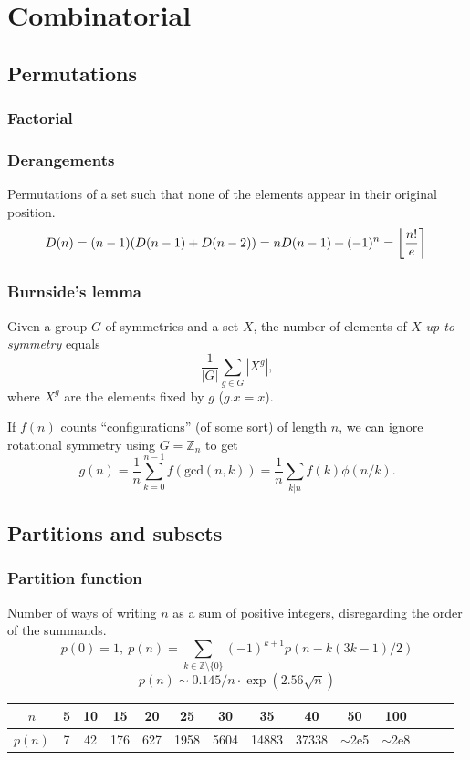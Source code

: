 \chapter{Combinatorial}

\section{Permutations}
	\subsection{Factorial}

	\subsection{Derangements}
		Permutations of a set such that none of the elements appear in their original position.
		\[ \mkern-2mu D(n) = (n-1)(D(n-1)+D(n-2)) = n D(n-1)+(-1)^n = \left\lfloor\frac{n!}{e}\right\rceil \]

	\subsection{Burnside's lemma}
		Given a group $G$ of symmetries and a set $X$, the number of elements of $X$ \emph{up to symmetry} equals
		 \[ {\frac {1}{|G|}}\sum _{{g\in G}}|X^{g}|, \]
		 where $X^{g}$ are the elements fixed by $g$ ($g.x = x$).

		 If $f(n)$ counts ``configurations'' (of some sort) of length $n$, we can ignore rotational symmetry using $G = \mathbb Z_n$ to get
		 \[ g(n) = \frac 1 n \sum_{k=0}^{n-1}{f(\text{gcd}(n, k))} = \frac 1 n \sum_{k|n}{f(k)\phi(n/k)}. \]

\section{Partitions and subsets}
	\subsection{Partition function}
		Number of ways of writing $n$ as a sum of positive integers, disregarding the order of the summands.
		\[ p(0) = 1,\ p(n) = \sum_{k \in \mathbb Z \setminus \{0\}}{(-1)^{k+1} p(n - k(3k-1) / 2)} \]
		\[ p(n) \sim 0.145 / n \cdot \exp(2.56 \sqrt{n}) \]

		\begin{center}
		\begin{tabular}{c|c@{\ }c@{\ }c@{\ }c@{\ }c@{\ }c@{\ }c@{\ }c@{\ }c@{\ }c@{\ }c@{\ }c@{\ }c}
			$n$    & 5 & 10 & 15  & 20  & 25   & 30   & 35    & 40    & 50  & 100 \\ \hline
			$p(n)$ & 7 & 42 & 176 & 627 & 1958 & 5604 & 14883 & 37338 & $\mathtt{\sim}$2e5 & $\mathtt{\sim}$2e8 \\
		\end{tabular}
		\end{center}

